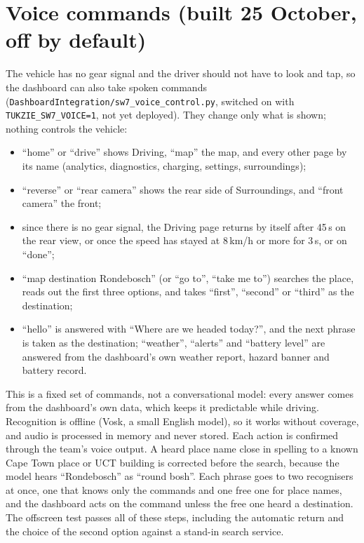 \section{Voice commands (built 25 October, off by default)}
\label{sec:ui-voice}

The vehicle has no gear signal and the driver should not have to look and tap, so the dashboard can also take spoken commands (\texttt{DashboardIntegration/\allowbreak{}sw7\_voice\_control.py}, switched on with \texttt{TUKZIE\_SW7\_VOICE=1}, not yet deployed). They change only what is shown; nothing controls the vehicle:
\begin{itemize}
\item ``home'' or ``drive'' shows Driving, ``map'' the map, and every other page by its name (analytics, diagnostics, charging, settings, surroundings);
\item ``reverse'' or ``rear camera'' shows the rear side of Surroundings, and ``front camera'' the front;
\item since there is no gear signal, the Driving page returns by itself after 45\,s on the rear view, or once the speed has stayed at 8\,km/h or more for 3\,s, or on ``done'';
\item ``map destination Rondebosch'' (or ``go to'', ``take me to'') searches the place, reads out the first three options, and takes ``first'', ``second'' or ``third'' as the destination;
\item ``hello'' is answered with ``Where are we headed today?'', and the next phrase is taken as the destination; ``weather'', ``alerts'' and ``battery level'' are answered from the dashboard's own weather report, hazard banner and battery record.
\end{itemize}
This is a fixed set of commands, not a conversational model: every answer comes from the dashboard's own data, which keeps it predictable while driving.
Recognition is offline (Vosk, a small English model), so it works without coverage, and audio is processed in memory and never stored. Each action is confirmed through the team's voice output. A heard place name close in spelling to a known Cape Town place or UCT building is corrected before the search, because the model hears ``Rondebosch'' as ``round bosh''. Each phrase goes to two recognisers at once, one that knows only the commands and one free one for place names, and the dashboard acts on the command unless the free one heard a destination. The offscreen test passes all of these steps, including the automatic return and the choice of the second option against a stand-in search service.

